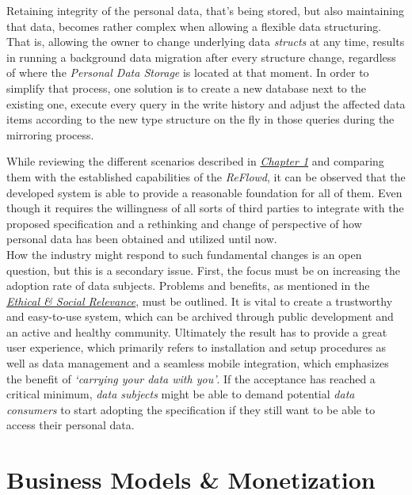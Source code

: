 \documentclass[12pt,english,a4paper,titlepage,cleardoublepage=empty,dottedtoc]{report}
\begin{document}
Retaining integrity of the personal data, that's being stored, but also
maintaining that data, becomes rather complex when allowing a flexible
data structuring. That is, allowing the owner to change underlying data
\emph{structs} at any time, results in running a background data
migration after every structure change, regardless of where the
\emph{Personal Data Storage} is located at that moment. In order to
simplify that process, one solution is to create a new database next to
the existing one, execute every query in the write history and adjust
the affected data items according to the new type structure on the fly
in those queries during the mirroring process.

While reviewing the different scenarios described in
\emph{\protect\hyperlink{scenarios}{Chapter 1}} and comparing them with
the established capabilities of the \emph{ReFlowd}, it can be observed
that the developed system is able to provide a reasonable foundation for
all of them. Even though it requires the willingness of all sorts of
third parties to integrate with the proposed specification and a
rethinking and change of perspective of how personal data has been
obtained and utilized until now.\\
How the industry might respond to such fundamental changes is an open
question, but this is a secondary issue. First, the focus must be on
increasing the adoption rate of data subjects. Problems and benefits, as
mentioned in the
\emph{\protect\hyperlink{ethical-social-relevance}{Ethical \& Social
Relevance}}, must be outlined. It is vital to create a trustworthy and
easy-to-use system, which can be archived through public development and
an active and healthy community. Ultimately the result has to provide a
great user experience, which primarily refers to installation and setup
procedures as well as data management and a seamless mobile integration,
which emphasizes the benefit of \emph{`carrying your data with you'}. If
the acceptance has reached a critical minimum, \emph{data subjects}
might be able to demand potential \emph{data consumers} to start
adopting the specification if they still want to be able to access their
personal data.

\section{Business Models \&
Monetization}\label{business-models-monetization}
\end{document}
